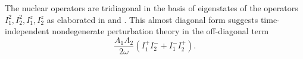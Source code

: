 \documentclass[aps, pra, amsfonts, a4paper, showpacs]{revtex4-1}
\begin{document}
The nuclear operators are tridiagonal in the basis of eigenstates of the operators $I_1^2, I_2^2, I_1^z, I_2^z$ as elaborated in \cite{petrov_coupled_2009} and \cite{kozlov_exactly_2007}. This almost diagonal form suggests time-independent nondegenerate perturbation theory in the off-diagonal term 
\[\frac{A_1A_2}{2\omega}(I_1^+ I_2^- + I_1^- I_2^+) .\]


\end{document}
